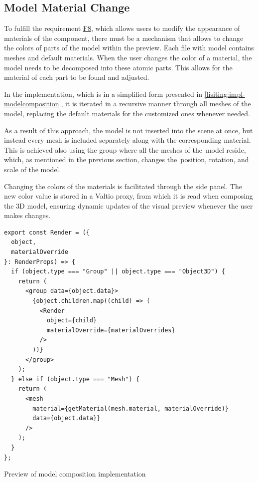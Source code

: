 \subsection{Model Material Change}

To fulfill the requirement \hyperref[itm:F8]{F8}, which allows users to modify the appearance of materials of the component, there must be a mechanism that allows to change the colors of parts of the model within the preview. Each  file with model contains meshes and default materials. When the user changes the color of a material, the model needs to be decomposed into these atomic parts. This allows for the material of each part to be found and adjusted. 

In the implementation, which is in a simplified form presented in \autoref{lisiting:impl-modelcomposition}, it is iterated in a recursive manner through all meshes of the model, replacing the default materials for the customized ones whenever needed. 

As a result of this approach, the model is not inserted into the scene at once, but instead every mesh is included separately along with the corresponding material. This is achieved also using the group where all the meshes of the~model reside, which, as mentioned in the previous section, changes the~position, rotation, and scale of the model.

Changing the colors of the materials is facilitated through the side panel. The new color value is stored in a Valtio proxy, from which it is read when composing the 3D model, ensuring dynamic updates of the visual preview whenever the user makes changes.

\begin{listing}[h!]
\begin{verbatim}
export const Render = ({
  object,
  materialOverride
}: RenderProps) => {
  if (object.type === "Group" || object.type === "Object3D") {
    return (
      <group data={object.data}>
        {object.children.map((child) => (
          <Render
            object={child}
            materialOverride={materialOverrides}
          />
        ))}
      </group>
    );
  } else if (object.type === "Mesh") {
    return (
      <mesh
        material={getMaterial(mesh.material, materialOverride)}
        data={object.data}}
      />
    );
  }
};
\end{verbatim}
\caption{Preview of model composition implementation}
\label{lisiting:impl-modelcomposition}
\end{listing}


